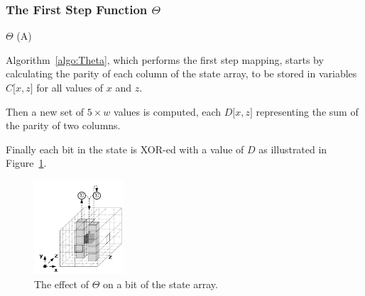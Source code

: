 \subsubsection{The First Step Function $\Theta$}
\begin{algorithm}[H]
\caption{$\Theta$ (A)}
\label{algo:Theta}
\begin{algorithmic}[1]
\EndFor{}

\EndFor{}

\EndFor{}

\end{algorithmic}
\end{algorithm}

Algorithm~\ref{algo:Theta}, which performs the first step mapping, starts by calculating the parity of each column of the state array, to be stored in variables $C\lbrack x,z\rbrack$ for all values of $x$ and $z$.

Then a new set of $5 \times w$ values is computed, each $D\lbrack x,z\rbrack$ representing the sum of the parity of two columns.

Finally each bit in the state is XOR-ed with a value of $D$ as illustrated in Figure~\ref{fig:Theta}.

\begin{figure}[H]
\centering
\includegraphics[width=0.3\textwidth]{img/Theta.png}
\caption{\label{fig:Theta}The effect of $\Theta$ on a bit of the state array.}
\end{figure}

